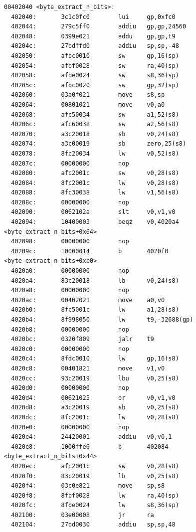 \documentclass[11pt]{article}
\begin{document}
\begin{verbatim}
00402040 <byte_extract_n_bits>:
  402040:       3c1c0fc0        lui     gp,0xfc0
  402044:       279c5ff0        addiu   gp,gp,24560
  402048:       0399e021        addu    gp,gp,t9
  40204c:       27bdffd0        addiu   sp,sp,-48
  402050:       afbc0010        sw      gp,16(sp)
  402054:       afbf0028        sw      ra,40(sp)
  402058:       afbe0024        sw      s8,36(sp)
  40205c:       afbc0020        sw      gp,32(sp)
  402060:       03a0f021        move    s8,sp
  402064:       00801021        move    v0,a0
  402068:       afc50034        sw      a1,52(s8)
  40206c:       afc60038        sw      a2,56(s8)
  402070:       a3c20018        sb      v0,24(s8)
  402074:       a3c00019        sb      zero,25(s8)
  402078:       8fc20034        lw      v0,52(s8)
  40207c:       00000000        nop
  402080:       afc2001c        sw      v0,28(s8)
  402084:       8fc2001c        lw      v0,28(s8)
  402088:       8fc30038        lw      v1,56(s8)
  40208c:       00000000        nop
  402090:       0062102a        slt     v0,v1,v0
  402094:       10400003        beqz    v0,4020a4 <byte_extract_n_bits+0x64>
  402098:       00000000        nop
  40209c:       10000014        b       4020f0 <byte_extract_n_bits+0xb0>
  4020a0:       00000000        nop
  4020a4:       83c20018        lb      v0,24(s8)
  4020a8:       00000000        nop
  4020ac:       00402021        move    a0,v0
  4020b0:       8fc5001c        lw      a1,28(s8)
  4020b4:       8f998050        lw      t9,-32688(gp)
  4020b8:       00000000        nop
  4020bc:       0320f809        jalr    t9
  4020c0:       00000000        nop
  4020c4:       8fdc0010        lw      gp,16(s8)
  4020c8:       00401821        move    v1,v0
  4020cc:       93c20019        lbu     v0,25(s8)
  4020d0:       00000000        nop
  4020d4:       00621025        or      v0,v1,v0
  4020d8:       a3c20019        sb      v0,25(s8)
  4020dc:       8fc2001c        lw      v0,28(s8)
  4020e0:       00000000        nop
  4020e4:       24420001        addiu   v0,v0,1
  4020e8:       1000ffe6        b       402084 <byte_extract_n_bits+0x44>
  4020ec:       afc2001c        sw      v0,28(s8)
  4020f0:       83c20019        lb      v0,25(s8)
  4020f4:       03c0e821        move    sp,s8
  4020f8:       8fbf0028        lw      ra,40(sp)
  4020fc:       8fbe0024        lw      s8,36(sp)
  402100:       03e00008        jr      ra
  402104:       27bd0030        addiu   sp,sp,48


\end{verbatim}
\end{document}
